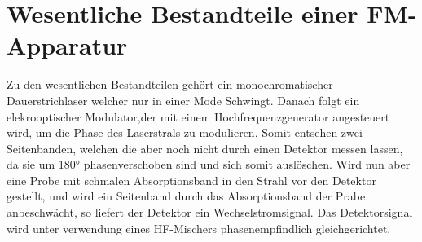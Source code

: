 
\section{Wesentliche Bestandteile einer FM-Apparatur}

Zu den wesentlichen Bestandteilen gehört ein monochromatischer Dauerstrichlaser welcher nur in einer Mode Schwingt. Danach folgt ein elekrooptischer Modulator,der mit einem Hochfrequenzgenerator angesteuert wird, um die Phase des Laserstrals zu modulieren. Somit entsehen zwei Seitenbanden, welchen die aber noch nicht durch einen Detektor messen lassen, da sie um 180° phasenverschoben sind und sich somit auslöschen. Wird nun aber eine Probe mit schmalen Absorptionsband in den Strahl vor den Detektor gestellt, und wird ein Seitenband durch das Absorptionsband der Prabe anbeschwächt, so liefert der Detektor ein Wechselstromsignal. Das Detektorsignal wird unter verwendung eines HF-Mischers phasenempfindlich gleichgerichtet.